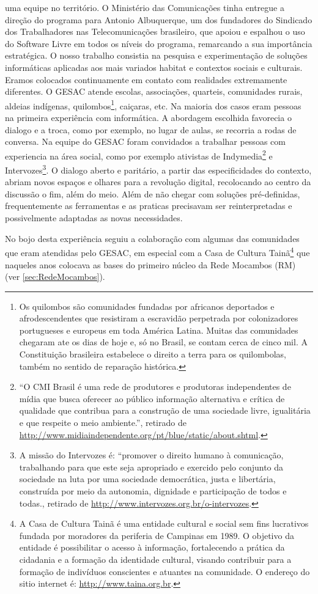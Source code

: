 uma equipe no território. O Ministério das Comunicações tinha entregue
a direção do programa para Antonio Albuquerque, um dos fundadores do
Sindicado dos Trabalhadores nas Telecomunicações brasileiro, que
apoiou e espalhou o uso do Software Livre em todos os níveis do
programa, remarcando a sua importância estratégica. O nosso trabalho
consistia na pesquisa e experimentação de soluções informáticas
aplicadas aos mais variados habitat e contextos sociais e
culturais. Eramos colocados continuamente em contato com realidades
extremamente diferentes. O GESAC atende escolas, associações,
quarteis, comunidades rurais, aldeias indígenas, quilombos\footnote{Os
  quilombos são comunidades fundadas por africanos deportados e
  afrodescendentes que resistiram a escravidão perpetrada por
  colonizadores portugueses e europeus em toda América Latina. Muitas
  das comunidades chegaram ate os dias de hoje e, só no Brasil, se
  contam cerca de cinco mil. A Constituição brasileira estabelece o
  direito a terra para os quilombolas, também no sentido de reparação
  histórica.}, caiçaras, etc. Na maioria dos casos eram pessoas na
primeira experiência com informática. A abordagem escolhida favorecia
o dialogo e a troca, como por exemplo, no lugar de aulas, se recorria
a rodas de conversa. Na equipe do GESAC foram convidados a trabalhar
pessoas com experiencia na área social, como por exemplo ativistas de
Indymedia\footnote{``O CMI Brasil é uma rede de produtores e
  produtoras independentes de mídia que busca oferecer ao público
  informação alternativa e crítica de qualidade que contribua para a
  construção de uma sociedade livre, igualitária e que respeite o meio
  ambiente.'', retirado de
  \url{http://www.midiaindependente.org/pt/blue/static/about.shtml}.}
e Intervozes\footnote{A missão do Intervozes é: ``promover o direito
  humano à comunicação, trabalhando para que este seja apropriado e
  exercido pelo conjunto da sociedade na luta por uma sociedade
  democrática, justa e libertária, construída por meio da autonomia,
  dignidade e participação de todos e todas., retirado de
  \url{http://www.intervozes.org.br/o-intervozes}.}. O dialogo aberto
e paritário, a partir das especificidades do contexto, abriam novos
espaços e olhares para a revolução digital, recolocando ao centro da
discussão o fim, além do meio. Além de não chegar com soluções
pré-definidas, frequentemente as ferramentas e as praticas precisavam
ser reinterpretadas e possivelmente adaptadas as novas necessidades.

No bojo desta experiência seguiu a colaboração com algumas das comunidades
que eram atendidas pelo GESAC, em especial com a Casa de Cultura
Tainã\footnote{A Casa de Cultura Tainã é uma entidade cultural e
  social sem fins lucrativos fundada por moradores da periferia de
  Campinas em 1989.  O objetivo da entidade é possibilitar o acesso à
  informação, fortalecendo a prática da cidadania e a formação da
  identidade cultural, visando contribuir para a formação de
  indivíduos conscientes e atuantes na comunidade. O endereço do sitio
  internet é: \url{http://www.taina.org.br}.} que naqueles anos
colocava as bases do primeiro núcleo da Rede Mocambos (RM) (ver
\ref{sec:RedeMocambos}).

